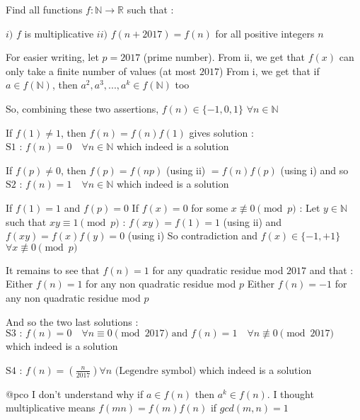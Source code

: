 \begin{solution}
	\begin{tcolorbox}Find all functions $f :\mathbb{N} \rightarrow \mathbb{R}$ such that :

 $i)$ $f$ is multiplicative
 $ii)$ $f(n+2017)=f(n)$ for all positive integers $n$\end{tcolorbox}
For easier writing, let $p=2017$ (prime number).
From ii, we get that $f(x)$ can only take a finite number of values (at most $2017$)
From i, we get that if $a\in f(\mathbb N)$, then $a^2,a^3,...,a^k\in f(\mathbb N)$ too

So, combining these two assertions, $f(n)\in\{-1,0,1\}$ $\forall n\in\mathbb N$

If $f(1)\ne 1$, then $f(n)=f(n)f(1)$ gives solution :
$\boxed{\text{S1 : }f(n)=0\quad\forall n\in\mathbb N}$ which indeed is a solution

If $f(p)\ne 0$, then $f(p)=f(np)$ (using ii) $=f(n)f(p)$ (using i) and so 
$\boxed{\text{S2 : }f(n)=1\quad\forall n\in\mathbb N}$ which indeed is a solution

If $f(1)=1$ and $f(p)=0$
If $f(x)=0$ for some $x\not\equiv 0\pmod p$ :
Let $y\in\mathbb N$ such that $xy\equiv 1\pmod p$ : $f(xy)=f(1)=1$ (using ii) and $f(xy)=f(x)f(y)=0$ (using i)
So contradiction  and $f(x)\in\{-1,+1\}$ $\forall x\not\equiv 0\pmod p$

It remains to see that $f(n)=1$ for any quadratic residue mod $2017$ and that :
Either $f(n)=1$ for any non quadratic residue mod $p$
Either $f(n)=-1$ for any non quadratic residue mod $p$

And so the two last solutions :
$\boxed{\text{S3 : }f(n)=0\quad\forall n\equiv 0\pmod{2017}\text{  and  }f(n)=1\quad\forall n\not\equiv 0\pmod{2017}}$ which indeed is a solution

$\boxed{\text{S4 : }f(n)=\left(\frac n{2017}\right)\forall n\text{ (Legendre symbol)}}$ which indeed is a solution



\end{solution}



\begin{solution}
	@pco I don't understand why if $a \in f(n)$ then $a^k \in f(n)$.
I thought multiplicative means $f(mn)=f(m)f(n)$ if $gcd(m,n)=1$
\end{solution}




